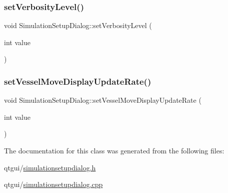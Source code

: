 \mbox{\label{class_simulation_setup_dialog_a5781c5f92780939509a0a50717c8cc72}} 
\subsubsection{\texorpdfstring{setVerbosityLevel()}{setVerbosityLevel()}}
{\footnotesize\ttfamily void Simulation\+Setup\+Dialog\+::set\+Verbosity\+Level (\begin{DoxyParamCaption}\item[{int}]{value }\end{DoxyParamCaption})}

\mbox{\label{class_simulation_setup_dialog_a6dafa75cf3ae80647804b90304aa31e9}} 
\subsubsection{\texorpdfstring{setVesselMoveDisplayUpdateRate()}{setVesselMoveDisplayUpdateRate()}}
{\footnotesize\ttfamily void Simulation\+Setup\+Dialog\+::set\+Vessel\+Move\+Display\+Update\+Rate (\begin{DoxyParamCaption}\item[{int}]{value }\end{DoxyParamCaption})}



The documentation for this class was generated from the following files\+:\begin{DoxyCompactItemize}
\item 
qtgui/\mbox{\hyperlink{simulationsetupdialog_8h}{simulationsetupdialog.\+h}}\item 
qtgui/\mbox{\hyperlink{simulationsetupdialog_8cpp}{simulationsetupdialog.\+cpp}}\end{DoxyCompactItemize}
